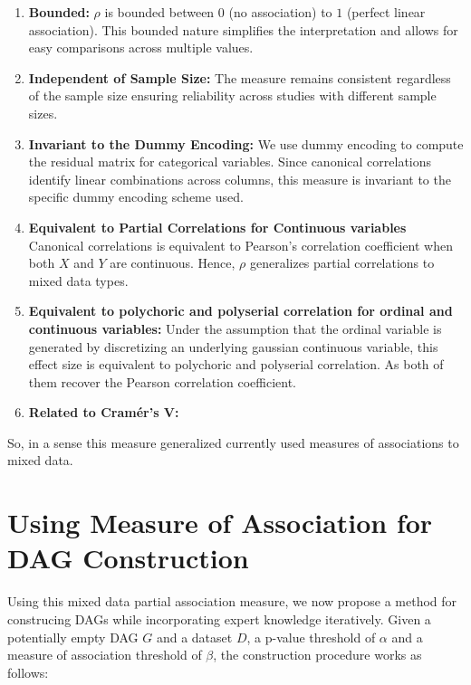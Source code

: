 \documentclass{uai2025} %
\begin{document}
\begin{enumerate}
	\item \textbf{Bounded: } $ \rho $ is bounded between $ 0 $ (no
		association) to $ 1 $ (perfect linear association). This bounded
		nature simplifies the interpretation and allows for easy 
		comparisons across multiple values.
	\item \textbf{Independent of Sample Size: } The measure remains consistent
		regardless of the sample size ensuring reliability across 
		studies with different sample sizes.
	\item \textbf{Invariant to the Dummy Encoding: } We use dummy encoding 
		to compute the residual matrix for categorical variables. Since
		canonical correlations identify linear combinations across
		columns, this measure is invariant to the specific dummy
		encoding scheme used.
	\item \textbf{Equivalent to Partial Correlations for Continuous variables}
		Canonical correlations is equivalent to Pearson's correlation coefficient
		when both $ X $ and $ Y $ are continuous. Hence, $ \rho $ generalizes
		partial correlations to mixed data types.
	\item \textbf{Equivalent to polychoric and polyserial correlation for
			ordinal and continuous variables: }
		Under the assumption that the ordinal variable is generated by
		discretizing an underlying gaussian continuous variable, this
		effect size is equivalent to polychoric and polyserial
		correlation. As both of them recover the Pearson correlation
		coefficient.
	\item \textbf{Related to Cram\'er's V: } 
\end{enumerate}

So, in a sense this measure generalized currently used measures of associations
to mixed data.

\section{Using Measure of Association for DAG Construction}
\label{sec:modification}

Using this mixed data partial association measure, we now propose a method for
construcing DAGs while incorporating expert knowledge iteratively. Given a
potentially empty DAG $ G $ and a dataset $ D $, a p-value threshold of $
\alpha $ and a measure of association threshold of $ \beta $, the construction
procedure works as follows:
\end{document}
